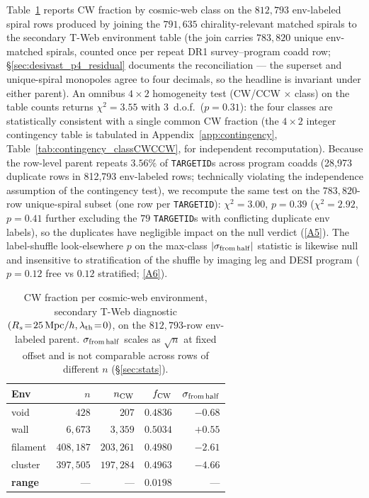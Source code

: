 \documentclass[aps,prd,twocolumn,superscriptaddress,showpacs,preprintnumbers,nofootinbib,longbibliography,floatfix]{revtex4-2}
\newcommand{\repoBase}{https://github.com/Hubify-Projects/bigbounce/blob/main}
\begin{document}
Table~\ref{tab:cw_vs_env} reports CW fraction by cosmic-web class on
the $812{,}793$ env-labeled spiral rows produced by joining the
$791{,}635$ chirality-relevant matched spirals to the secondary T-Web
environment table (the join carries $783{,}820$ unique env-matched
spirals, counted once per repeat DR1 survey--program coadd row;
\S\ref{sec:desivast_p4_residual} documents the reconciliation — the
superset and unique-spiral monopoles agree to four decimals, so the
headline is invariant under either parent). An omnibus $4\times2$
homogeneity test (CW/CCW $\times$ class) on the table counts returns
$\chi^2 = 3.55$ with 3~d.o.f.\ ($p = 0.31$): the four classes are
statistically consistent with a single common CW fraction (the
$4{\times}2$ integer contingency table is tabulated in
Appendix~\ref{app:contingency}, Table~\ref{tab:contingency_classCWCCW},
for independent recomputation). Because
the row-level parent repeats $3.56\%$ of \texttt{TARGETID}s across program coadds
(28{,}973 duplicate rows in 812{,}793 env-labeled rows; technically violating the independence assumption of
the contingency test), we recompute the same test on the
$783{,}820$-row unique-spiral subset (one row per \texttt{TARGETID}):
$\chi^2 = 3.00$, $p = 0.39$ ($\chi^2 = 2.92$, $p = 0.41$ further
excluding the $79$ \texttt{TARGETID}s with conflicting duplicate env
labels), so the duplicates have negligible impact on the null verdict
(\href{\repoBase/pipelines/p5\_desi\_chirality/outputs/21\_r23conf\_meta\_closures.json}{[A5]}). The
label-shuffle look-elsewhere $p$ on the max-class
$|\sigma_{\rm from\,half}|$ statistic is likewise null and insensitive
to stratification of the shuffle by imaging leg and DESI program
($p = 0.12$ free vs $0.12$ stratified;
\href{\repoBase/pipelines/p5\_desi\_chirality/outputs/18\_v0151\_stratified\_and\_density.json}{[A6]}).

\begin{table}[!htbp]
\caption{CW fraction per cosmic-web environment, secondary T-Web
diagnostic $(R_s\!=\!25\,{\rm Mpc}/h, \lambda_{\rm th}\!=\!0)$, on the
$812{,}793$-row env-labeled parent. $\sigma_{\rm from\,half}$ scales
as $\sqrt{n}$ at fixed offset and is not comparable across rows of
different $n$ (\S\ref{sec:stats}).}
\label{tab:cw_vs_env}
\begin{ruledtabular}
\begin{tabular}{lrrrr}
Env & $n$ & $n_{\rm CW}$ & $f_{\rm CW}$ & $\sigma_{\rm from\,half}$ \\
\hline
void & $428$ & $207$ & $0.4836$ & $-0.68$ \\
wall & $6{,}673$ & $3{,}359$ & $0.5034$ & $+0.55$ \\
filament & $408{,}187$ & $203{,}261$ & $0.4980$ & $-2.61$ \\
cluster & $397{,}505$ & $197{,}284$ & $0.4963$ & $-4.66$ \\
\hline
\textbf{range} & --- & --- & $\mathbf{0.0198}$ & --- \\
\end{tabular}
\end{ruledtabular}
\end{table}
\end{document}
